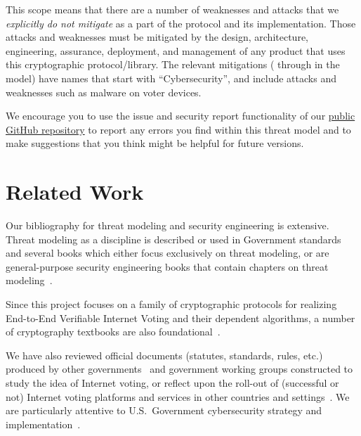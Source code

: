 \documentclass[10pt,letterpaper]{article}
\begin{document}
This scope means that there are a number of weaknesses and attacks that we \emph{explicitly do not mitigate} as a part of the protocol and its implementation. Those attacks and weaknesses must be mitigated by the design, architecture, engineering, assurance, deployment, and management of any product that uses this cryptographic protocol/library. The relevant mitigations (\RefNumMCybersecurityEscalation{} through \RefNumMCybersecurityVirtualization{} in the model) have names that start with ``Cybersecurity'', and include attacks and weaknesses such as malware on voter devices.

We encourage you to use the issue and security report functionality of our \href{https://github.com/FreeAndFair/VoteSecure}{public GitHub repository} to report any errors you find within this threat model and to make suggestions that you think might be helpful for future versions.

\section{Related Work}
\label{sec:related_work}

Our bibliography for threat modeling and security engineering is extensive. Threat modeling as a discipline is described or used in Government standards~\cite{JointTaskForceTransformationInitiativeGuideconductingrisk2012} and several books which either focus exclusively on threat modeling, or are general-purpose security engineering books that contain chapters on threat modeling~\cite{ShostackThreatmodelingdesigning2014,TarandachColesThreatModeling2020,SwiderskiThreatModeling2004,AndersonSecurityEngineeringGuide2020,DeogunSecureDesign2019,WoodyCyberSecurityEngineering2016,BishopComputerSecurityArt2018,IdreesModelSystemAdversary2014}.

Since this project focuses on a family of cryptographic protocols for realizing End-to-End Verifiable Internet Voting and their dependent algorithms, a number of cryptography textbooks are also foundational~\cite{FergusonCryptographyEngineeringDesign2010,DanBonehGraduateCourseApplied2023,KatzIntroductionModernCryptography2007}.

We have also reviewed official documents (statutes, standards, rules, etc.) produced by other governments~\cite{AustralianSignalsDirectorateEtAlChoosingSecure,EuroparatStandardsEvoting2018} and government working groups constructed to study the idea of Internet voting, or reflect upon the roll-out of (successful or not) Internet voting platforms and services in other countries and settings~\cite{ElectoralCouncilofAustralia&NewZealandElevenEssential2017,BruterEtAlStudyEVoting2023,BagnatoRecommendationCMREC201752022,AppelCACVoteAnother2024}. We are particularly attentive to U.S.~Government cybersecurity strategy and implementation~\cite{TheWhiteHouseNationalCybersecurity2023,TheWhiteHouseNationalCybersecurity2023a,TheWhiteHouseNationalCybersecurity2024}.
\end{document}

